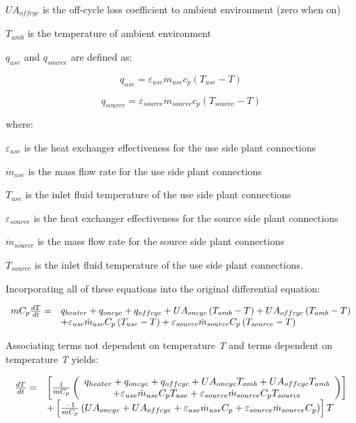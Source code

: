 \(UA_{offcyc}\) is the off-cycle loss coefficient to ambient environment (zero when on)

\(T_{amb}\) is the temperature of ambient environment

\(q_{use}\) and \(q_{source}\) are defined as:

\begin{equation}
{q_{use}} = {\varepsilon_{use}}{\dot m_{use}}{c_p}\left( {{T_{use}} - T} \right)
\end{equation}

\begin{equation}
{q_{source}} = {\varepsilon_{source}}{\dot m_{source}}{c_p}\left( {{T_{source}} - T} \right)
\end{equation}

where:

\({\varepsilon_{use}}\) is the heat exchanger effectiveness for the use side plant connections

\({\dot m_{use}}\) is the mass flow rate for the use side plant connections

\(T_{use}\) is the inlet fluid temperature of the use side plant connections

\({\varepsilon_{source}}\) is the heat exchanger effectiveness for the source side plant connections

\({\dot m_{source}}\) is the mass flow rate for the source side plant connections

\(T_{source}\) is the inlet fluid temperature of the use side plant connections.

Incorporating all of these equations into the original differential equation:

\begin{equation}
  \begin{array}{rl}
    mC_p\frac{dT}{dt} =& q_{heater} + q_{oncyc} + q_{offcyc} + UA_{oncyc} \left(T_{amb} - T\right) + UA_{offcyc} \left(T_{amb} - T\right) \\
                      &+ \varepsilon_{use}\dot{m}_{use}C_p \left(T_{use} - T\right) + \varepsilon_{source}\dot{m}_{source}C_p \left(T_{source} - T\right)
  \end{array}
\end{equation}

Associating terms not dependent on temperature \emph{T} and terms dependent on temperature \emph{T} yields:

\begin{equation}
  \begin{array}{rl}
    \frac{dT}{dt} =& \left[\frac{1}{mC_p}\left(\begin{array}{c}
                                             q_{heater}+q_{oncyc}+q_{offcyc}+UA_{oncyc}T_{amb}+UA_{offcyc}T_{amb} \\
                                             + \varepsilon_{use}\dot{m}_{use}C_pT_{use} + \varepsilon_{source}\dot{m}_{source}C_pT_{source}
                                           \end{array}\right)\right] \\
                  &+ \left[\frac{-1}{mC_p}\left(UA_{oncyc} + UA_{offcyc}+\varepsilon_{use}\dot{m}_{use}C_p+\varepsilon_{source}\dot{m}_{source}C_p\right)\right]T
  \end{array}
\end{equation}

